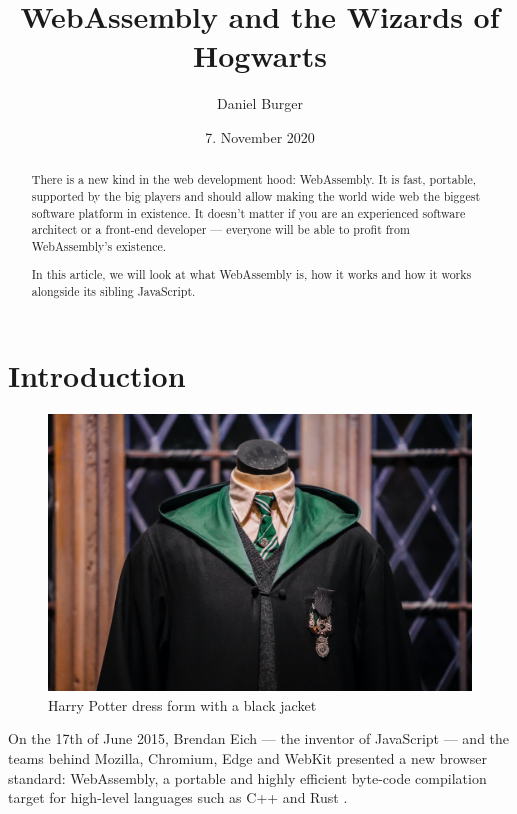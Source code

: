 \documentclass[11pt]{article}
\title{WebAssembly and the Wizards of Hogwarts}
\author{Daniel Burger}
\date{7. November 2020}
\begin{document}
\maketitle
\pagebreak

\begin{abstract}
  There is a new kind in the web development hood: WebAssembly. It is fast, portable, supported by the big players and should allow making the world wide web the biggest software platform in existence. It doesn’t matter if you are an experienced software architect or a front-end developer — everyone will be able to profit from WebAssembly’s existence.

  In this article, we will look at what WebAssembly is, how it works and how it works alongside its sibling JavaScript.

\end{abstract}
\pagebreak

\tableofcontents
\pagebreak

\section{Introduction}
\label{sec:introduction}

\begin{figure}[ht]
  \centering
  \includegraphics[width=\textwidth]{figures/001.jpg}
  \caption{Harry Potter dress form with a black jacket \citep{unsplash_beautiful_2018}}
  \label{fig:cover}
\end{figure}

On the 17th of June 2015, Brendan Eich — the inventor of JavaScript — and the teams behind Mozilla, Chromium, Edge and WebKit presented a new browser standard: WebAssembly, a portable and highly efficient byte-code compilation target for high-level languages such as C++ and Rust \citep{eich_asmjs_2015}.
\end{document}
